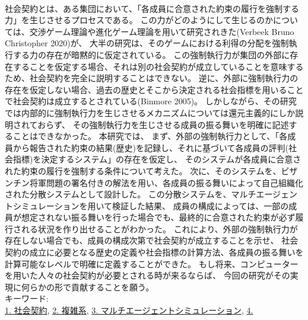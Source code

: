 
~ \\
  社会契約とは、ある集団において、「各成員に合意された約束の履行を強制する力」を生じさせるプロセスである。
  この力がどのようにして生じるのかについては、交渉ゲーム理論や進化ゲーム理論を用いて研究されきた(Verbeek Bruno Christopher 2020)\cite{sep-game-ethics}が、
  大半の研究は、そのゲームにおける利得の分配を強制執行する力の存在が暗黙的に仮定されている。
  この強制執行力が集団の外部に存在することを仮定する場合、それは別の社会契約が成立していることを意味するため、社会契約を完全に説明することはできない。
  逆に、外部に強制執行力の存在を仮定しない場合、過去の歴史とそこから決定される社会指標を用いることで社会契約は成立するとされている(Binmore 2005)。
  しかしながら、その研究では内部的に強制執行力を生じさせるメカニズムについては還元主義的にしか説明されておらず、
  その強制執行力を生じさせる成員の振る舞いを明確に記述することはできなかった。
  本研究では、
  まず、外部の強制執行力として、「各成員から報告された約束の結果(歴史)を記録し、それに基づいて各成員の評判(社会指標)を決定するシステム」の存在を仮定し、
  そのシステムが各成員に合意された約束の履行を強制する条件について考えた。
  次に、そのシステムを、ビザンチン将軍問題の署名付きの解法を用い、各成員の振る舞いによって自己組織化された分散システムとして設計した。
  この分散システムを、マルチエージェントシミュレーションを用いて検証した結果、
  成員の構成によっては、一部の成員が想定されない振る舞いを行った場合でも、最終的に合意された約束が必ず履行される状況を作り出せることがわかった。
  これにより、外部の強制執行力が存在しない場合でも、成員の構成次第で社会契約が成立することを示せ、
  社会契約の成立に必要となる歴史の定義や社会指標の計算方法、各成員の振る舞いを計算可能なレベルで明確に定義することができた。
  もし将来、コンピューターを用いた人々の社会契約が必要とされる時が来るならば、
  今回の研究がその実現に何らかの形で貢献することを願う。
~ \\
キーワード:\\
\underline{1. 社会契約},
\underline{2. 複雑系},
\underline{3. マルチエージェントシミュレーション},
\underline{4. }
\begin{flushright}
\dept \\
\author
\end{flushright}
